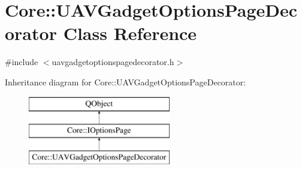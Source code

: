 \hypertarget{class_core_1_1_u_a_v_gadget_options_page_decorator}{\section{Core\-:\-:U\-A\-V\-Gadget\-Options\-Page\-Decorator Class Reference}
\label{class_core_1_1_u_a_v_gadget_options_page_decorator}
}


{\ttfamily \#include $<$uavgadgetoptionspagedecorator.\-h$>$}

Inheritance diagram for Core\-:\-:U\-A\-V\-Gadget\-Options\-Page\-Decorator\-:\begin{figure}[H]
\begin{center}
\leavevmode
\includegraphics[height=3.000000cm]{class_core_1_1_u_a_v_gadget_options_page_decorator}
\end{center}
\end{figure}
